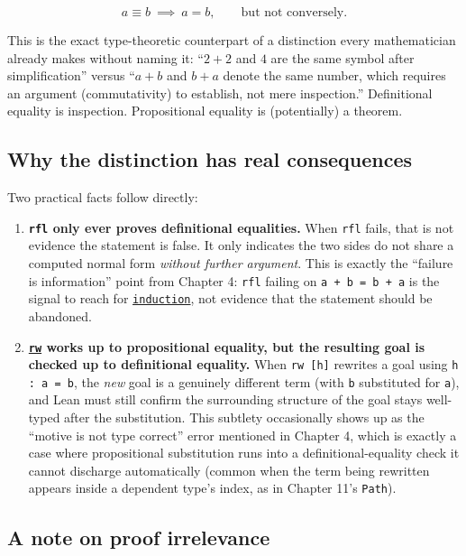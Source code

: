 \[
a \equiv b \ \implies\ a = b, \qquad\text{but not conversely.}
\]

This is the exact type-theoretic counterpart of a distinction every mathematician already makes without naming it: ``\(2+2\) and \(4\) are the same symbol after simplification'' versus ``\(a+b\) and \(b+a\) denote the same number, which requires an argument (commutativity) to establish, not mere inspection.'' Definitional equality is inspection. Propositional equality is (potentially) a theorem.

\subsection{Why the distinction has real consequences}\label{sec:05-rigor-check:04-defeq-vs-propeq:5}

Two practical facts follow directly:

\begin{enumerate}
\def\labelenumi{\arabic{enumi}.}
\tightlist
\item
  \textbf{\texttt{rfl} only ever proves definitional equalities.} When \texttt{rfl} fails, that is not evidence the statement is false. It only indicates the two sides do not share a computed normal form \emph{without further argument}. This is exactly the ``failure is information'' point from Chapter 4: \texttt{rfl} failing on \texttt{a + b = b + a} is the signal to reach for \href{https://lean-lang.org/doc/reference/latest/Tactic-Proofs/Tactic-Reference/}{\texttt{induction}}, not evidence that the statement should be abandoned.
\item
  \textbf{\href{https://lean-lang.org/doc/reference/latest/Tactic-Proofs/Tactic-Reference/}{\texttt{rw}} works up to propositional equality, but the resulting goal is checked up to definitional equality.} When \texttt{rw [h]} rewrites a goal using \texttt{h : a = b}, the \emph{new} goal is a genuinely different term (with \texttt{b} substituted for \texttt{a}), and Lean must still confirm the surrounding structure of the goal stays well-typed after the substitution. This subtlety occasionally shows up as the ``motive is not type correct'' error mentioned in Chapter 4, which is exactly a case where propositional substitution runs into a definitional-equality check it cannot discharge automatically (common when the term being rewritten appears inside a dependent type's index, as in Chapter 11's \texttt{Path}).
\end{enumerate}

\subsection{A note on proof irrelevance}\label{sec:05-rigor-check:04-defeq-vs-propeq:6}

